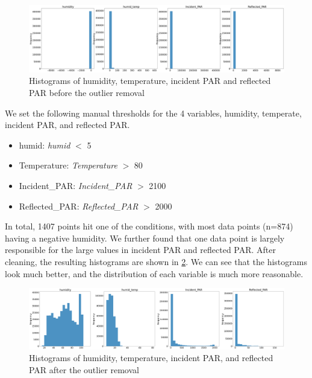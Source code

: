 \documentclass[11pt, letterpaper]{article}
\begin{document}
\begin{figure}[h!]
\centering
\captionsetup{justification=centering}
\includegraphics[width=1.0\textwidth]{Fig3_combined_hist.png}
\caption{Histograms of humidity, temperature, incident PAR and reflected PAR before the outlier removal}
\label{fig3:combined_hist}
\end{figure}

We set the following manual thresholds for the 4  variables, humidity, temperate, incident PAR, and reflected PAR.

\begin{itemize}
    \item humid: \textit{humid} $<$ 5
    \item Temperature: \textit{Temperature} $>$  80
    \item Incident\_PAR: \textit{Incident\_PAR} $>$  2100
    \item Reflected\_PAR: \textit{Reflected\_PAR} $>$  2000
\end{itemize}
In total, 1407 points hit one of the conditions, with most data points (n=874) having a negative humidity. We further found that one data point is largely responsible for the large values in incident PAR and reflected PAR. After cleaning, the resulting histograms are shown in \ref{fig3:combined_hist_after_clean}. We can see that the histograms look much better, and the distribution of each variable is much more reasonable.

\begin{figure}[h!]
\centering
\captionsetup{justification=centering}
\includegraphics[width=1.0\textwidth]{Fig4_combined_hist_after.png}
\caption{Histograms of humidity, temperature, incident PAR, and reflected PAR after the outlier removal}
\label{fig3:combined_hist_after_clean}
\end{figure}
\end{document}
